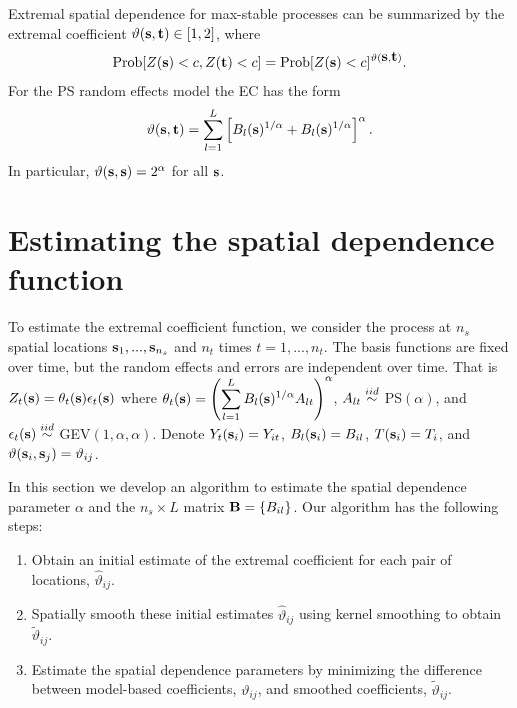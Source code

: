 \documentclass[11pt]{article}
\begin{document}
Extremal spatial dependence for max-stable processes can be summarized by the extremal coefficient \citep[EC]{Schlather2003} $\vartheta(\mbox{\bf s},\mbox{\bf t})\in[1,2]$, where
\begin{align} \label{ebeq:ECdev}
  \mbox{Prob}[Z(\mbox{\bf s})<c,Z(\mbox{\bf t})<c] = \mbox{Prob}[Z(\mbox{\bf s})<c]^{\vartheta(\mbox{\bf s},\mbox{\bf t})}.
\end{align}
For the PS random effects model the EC has the form
\begin{align} \label{ebeq:EC}
   \vartheta(\mbox{\bf s},\mbox{\bf t}) = \sum_{l=1}^L \left[B_{l}(\mbox{\bf s})^{1/\alpha}+B_{l}(\mbox{\bf s})^{1/\alpha}\right]^\alpha.
\end{align}
In particular, $\vartheta(\mbox{\bf s},\mbox{\bf s}) = 2^{\alpha}$ for all $\mbox{\bf s}$.

\section{Estimating the spatial dependence function}\label{ebs:estimation}
To estimate the extremal coefficient function, we consider the process at $n_s$ spatial locations $\mbox{\bf s}_1,...,\mbox{\bf s}_{n_s}$ and $n_t$ times $t=1,...,n_t$.
The basis functions are fixed over time, but the random effects and errors are independent over time.
That is $Z_t(\mbox{\bf s}) = \theta_t(\mbox{\bf s}) \epsilon_t(\mbox{\bf s})$ where $\theta_t(\mbox{\bf s}) = \left(\displaystyle \sum_{l=1}^L B_{l}(\mbox{\bf s})^{1/\alpha}A_{lt}\right)^{\alpha}$, $A_{lt} \stackrel{iid}{\sim}$ PS$(\alpha)$, and $\epsilon_t(\mbox{\bf s}) \stackrel{iid}{\sim}$ GEV$(1, \alpha, \alpha)$.
Denote $Y_t(\mbox{\bf s}_i) = Y_{it}$, $B_l(\mbox{\bf s}_i) = B_{il}$, $T(\mbox{\bf s}_i)=T_i$, and $\vartheta(\mbox{\bf s}_i,\mbox{\bf s}_j) = \vartheta_{ij}$.

In this section we develop an algorithm to estimate the spatial dependence parameter $\alpha$ and the $n_s\times L$ matrix $\mbox{\bf B} = \{B_{il}\}$.
Our algorithm has the following steps:
\begin{enumerate}[(1)]
  \item Obtain an initial estimate of the extremal coefficient for each pair of locations, ${\hat \vartheta}_{ij}$.
  \item Spatially smooth these initial estimates ${\hat \vartheta}_{ij}$ using kernel smoothing to obtain ${\tilde \vartheta}_{ij}$.
  \item Estimate the spatial dependence parameters by minimizing the difference between model-based coefficients, $\vartheta_{ij}$, and smoothed coefficients, ${\tilde \vartheta}_{ij}$.
\end{enumerate}
\end{document}
